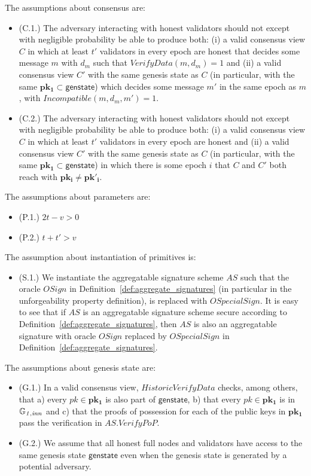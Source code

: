 \noindent The assumptions about consensus are:
\begin{itemize}
\item (C.1.) The adversary interacting with honest validators should not except with negligible probability be able to produce both:
(i) a valid consensus view $C$ in which at least $t'$ validators in every epoch are honest that decides some message $m$ 
with $d_m$ such that $\mathit{VerifyData}(m, d_m) =1$ and 
(ii) a valid consensus view $C'$ with the same genesis state as $C$ (in particular, with the same $\mathbf{pk_1} \subset \mathsf{genstate}$) 
which decides some message $m'$ in the same epoch as $m$, with $\mathit{Incompatible}(m, d_m, m') = 1$. 
\item (C.2.) The adversary interacting with honest validators should not except with negligible probability be able to produce both:
(i) a valid consensus view $C$ in which at least $t'$ validators in every epoch are honest and 
(ii)  a valid consensus view $C'$ with the same genesis state as $C$ (in particular, with the same $\mathbf{pk_1} \subset \mathsf{genstate}$) 
in which there is some epoch $i$ that $C$ and $C'$ both reach with $\mathbf{pk_i} \neq \mathbf{pk'_i}$.
\end{itemize}

\noindent The assumptions about parameters are:
\begin{itemize}
\item (P.1.) $2t -v > 0$
\item (P.2.) $t + t' > v$
\end{itemize}

\noindent The assumption about instantiation of primitives is:
\begin{itemize}
\item (S.1.) We instantiate the aggregatable signature scheme $\mathit{AS}$ 
such that the oracle $\mathit{OSign}$ in Definition~\ref{def:aggregate_signatures} (in particular in the 
unforgeability property definition), is replaced with $\mathit{OSpecialSign}$. It is easy to see that if $\mathit{AS}$ 
is an aggregatable signature scheme secure according to Definition~\ref{def:aggregate_signatures},  
then $\mathit{AS}$ is also an aggregatable signature with oracle $\mathit{OSign}$ replaced by 
$\mathit{OSpecialSign}$ in Definition~\ref{def:aggregate_signatures}.
\end{itemize}

\noindent The assumptions about genesis state are:
\begin{itemize}
\item (G.1.) In a valid consensus view, $\mathit{HistoricVerifyData}$ checks, among others, that 
a) every $\mathit{pk} \in \mathbf{pk_1}$ is also part of  $\mathsf{genstate}$, b) that every $\mathit{pk} \in \mathbf{pk_1}$ is in $\mathbb{G}_{\mathit{1,inn}}$ 
and c) that the proofs of possession for each of the public keys in $ \mathbf{pk_1}$ pass the verification in $\mathit{AS.VerifyPoP}$.
\item  (G.2.) We assume that all honest full nodes and validators have access to the same genesis state 
$\mathsf{genstate}$ even when the genesis state is generated by a potential adversary.
\end{itemize}

